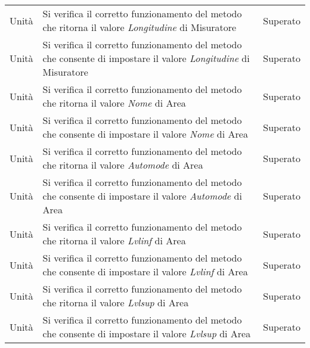 \begin{center}
\begin{xltabular}{\linewidth}{|l|X|l|}
        Unità & Si verifica il corretto funzionamento del metodo che ritorna il valore \textit{Longitudine} di Misuratore & Superato\\
        Unità & Si verifica il corretto funzionamento del metodo che consente di impostare il valore \textit{Longitudine} di Misuratore & Superato\\
        Unità & Si verifica il corretto funzionamento del metodo che ritorna il valore \textit{Nome} di Area & Superato\\
        Unità & Si verifica il corretto funzionamento del metodo che consente di impostare il valore \textit{Nome} di Area & Superato\\
        Unità & Si verifica il corretto funzionamento del metodo che ritorna il valore \textit{Automode} di Area & Superato\\
        Unità & Si verifica il corretto funzionamento del metodo che consente di impostare il valore \textit{Automode} di Area & Superato\\
        Unità & Si verifica il corretto funzionamento del metodo che ritorna il valore \textit{Lvlinf} di Area & Superato\\
        Unità & Si verifica il corretto funzionamento del metodo che consente di impostare il valore \textit{Lvlinf} di Area & Superato\\
        Unità & Si verifica il corretto funzionamento del metodo che ritorna il valore \textit{Lvlsup} di Area & Superato\\
        Unità & Si verifica il corretto funzionamento del metodo che consente di impostare il valore \textit{Lvlsup} di Area & Superato\\


\end{xltabular}
\end{center}
